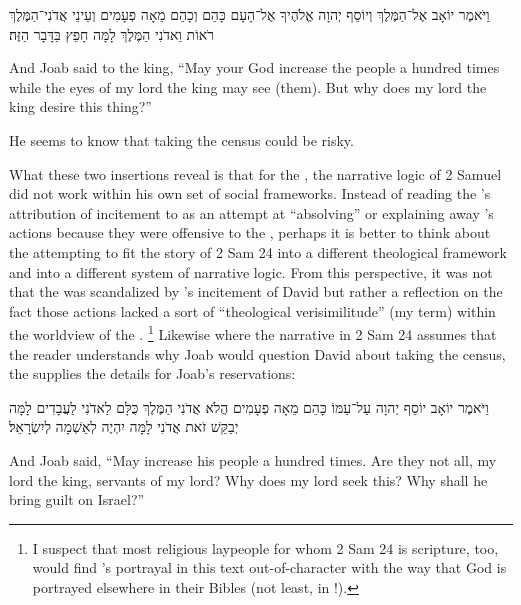 \begin{hebrewtext}
    וַיֹּאמֶר יוֹאָב אֶל־הַמֶּלֶךְ וְיוֹסֵף יְהוָה אֱלֹהֶיךָ אֶל־הָעָם כָּהֵם וְכָהֵם מֵאָה פְעָמִים וְעֵינֵי אֲדֹנִי־הַמֶּלֶךְ רֹאוֹת וַאדֹנִי הַמֶּלֶךְ לָמָּה חָפֵץ בַּדָּבָר הַזֶּה׃
\end{hebrewtext}
\begin{translation}
    And Joab said to the king, ``May \yahweh your God increase the people a hundred times while the eyes of my lord the king may see (them). But why does my lord the king desire this thing?''
\end{translation}
\noindent
He seems to know that taking the census could be risky. 

What these two insertions reveal is that for the \chronicler, the narrative logic of 2 Samuel did not work within his own set of social frameworks. Instead of reading the \chronicler's attribution of incitement to  as an attempt at ``absolving'' or explaining away \yahweh's actions because they were offensive to the \chronicler, perhaps it is better to think about the \chronicler attempting to fit the story of 2 Sam 24 into a different theological framework and into a different system of narrative logic. From this perspective, it was not that the \chronicler was scandalized by \yahweh's incitement of David but rather a reflection on the fact those actions lacked a sort of ``theological verisimilitude'' (my term) within the worldview of the \chronicler.%
    \footnote{I suspect that most religious laypeople for whom 2 Sam 24 is scripture, too, would find \yahweh's portrayal in this text out-of-character with the way that God is portrayed elsewhere in their Bibles (not least, in \chronicles!).}
Likewise where the narrative in 2 Sam 24 assumes that the reader understands why Joab would question David about taking the census, the \chronicler supplies the details for Joab's reservations:
\begin{hebrewtext}
    וַיֹּאמֶר יוֹאָב יוֹסֵף יְהוָה עַל־עַמּוֹ כָּהֵם מֵאָה פְעָמִים הֲלֹא אֲדֹנִי הַמֶּלֶךְ כֻּלָּם לַאדֹנִי לַעֲבָדִים לָמָּה יְבַקֵּשׁ זֹאת אֲדֹנִי לָמָּה יִהְיֶה לְאַשְׁמָה לְיִשְׂרָאֵל׃
\end{hebrewtext}
\begin{translation}
    And Joab said, ``May \yahweh increase his people a hundred times. Are they not all, my lord the king, servants of my lord? Why does my lord seek this? Why shall he bring guilt on Israel?''
\end{translation}
